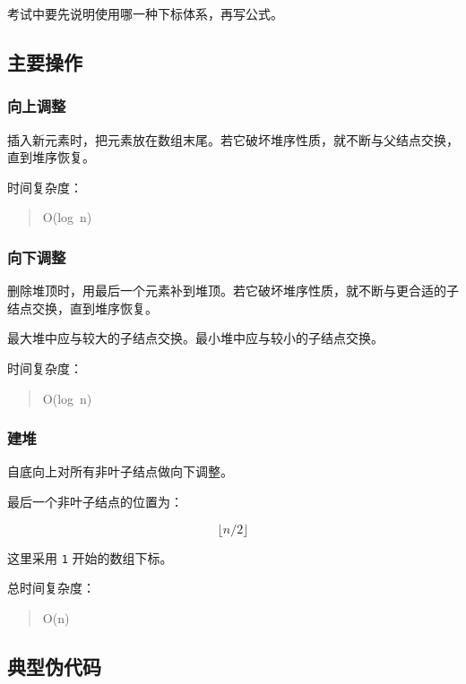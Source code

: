 \documentclass[UTF8,zihao=-4]{ctexart}
\begin{document}
考试中要先说明使用哪一种下标体系，再写公式。

\subsection*{主要操作}

\subsubsection*{向上调整}

插入新元素时，把元素放在数组末尾。若它破坏堆序性质，就不断与父结点交换，直到堆序恢复。

时间复杂度：

\begin{quote}
\small\ttfamily\raggedright
\relax O(log\ n)\\
\end{quote}

\subsubsection*{向下调整}

删除堆顶时，用最后一个元素补到堆顶。若它破坏堆序性质，就不断与更合适的子结点交换，直到堆序恢复。

最大堆中应与较大的子结点交换。最小堆中应与较小的子结点交换。

时间复杂度：

\begin{quote}
\small\ttfamily\raggedright
\relax O(log\ n)\\
\end{quote}

\subsubsection*{建堆}

自底向上对所有非叶子结点做向下调整。

最后一个非叶子结点的位置为：

\[\lfloor n / 2 \rfloor\]

这里采用 \texttt{1} 开始的数组下标。

总时间复杂度：

\begin{quote}
\small\ttfamily\raggedright
\relax O(n)\\
\end{quote}

\subsection*{典型伪代码}
\end{document}
